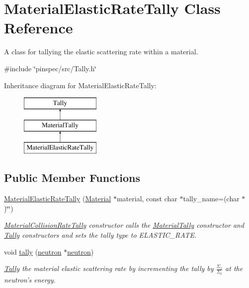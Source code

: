 \hypertarget{classMaterialElasticRateTally}{\section{Material\-Elastic\-Rate\-Tally Class Reference}
\label{classMaterialElasticRateTally}
}


A class for tallying the elastic scattering rate within a material.  




{\ttfamily \#include \char`\"{}pinspec/src/\-Tally.\-h\char`\"{}}

Inheritance diagram for Material\-Elastic\-Rate\-Tally\-:\begin{figure}[H]
\begin{center}
\leavevmode
\includegraphics[height=3.000000cm]{classMaterialElasticRateTally}
\end{center}
\end{figure}
\subsection*{Public Member Functions}
\begin{DoxyCompactItemize}
\item 
\hyperlink{classMaterialElasticRateTally_a4f2365c949a7bc093c4c71484363daa3}{Material\-Elastic\-Rate\-Tally} (\hyperlink{classMaterial}{Material} $\ast$material, const char $\ast$tally\-\_\-name=(char $\ast$)\char`\"{}\char`\"{})
\begin{DoxyCompactList}\small\item\em \hyperlink{classMaterialCollisionRateTally}{Material\-Collision\-Rate\-Tally} constructor calls the \hyperlink{classMaterialTally}{Material\-Tally} constructor and \hyperlink{classTally}{Tally} constructors and sets the tally type to E\-L\-A\-S\-T\-I\-C\-\_\-\-R\-A\-T\-E. \end{DoxyCompactList}\item 
void \hyperlink{classMaterialElasticRateTally_a8d3104a906c10b34c236275f65aa610d}{tally} (\hyperlink{structneutron}{neutron} $\ast$\hyperlink{structneutron}{neutron})
\begin{DoxyCompactList}\small\item\em \hyperlink{classTally}{Tally} the material elastic scattering rate by incrementing the tally by $ \frac{\Sigma_s}{\Sigma_t} $ at the neutron's energy. \end{DoxyCompactList}\end{DoxyCompactItemize}
